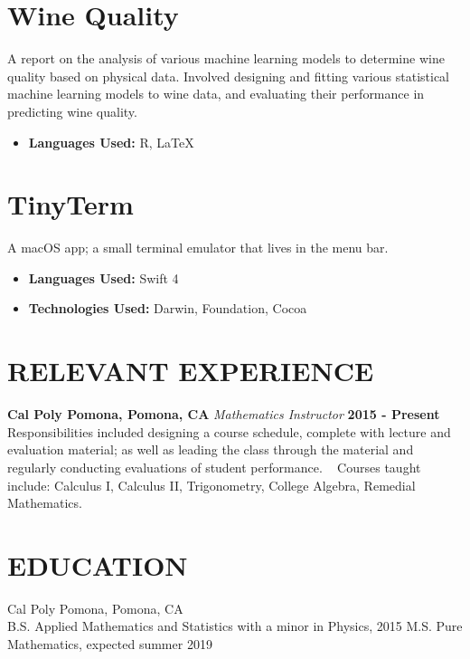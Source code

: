 \documentclass[margin]{../res}
\begin{document}
\begin{resume}
\normalsize{\section{Wine Quality}}
A report on the analysis of various machine learning models to determine wine
quality based on physical data.
Involved designing and fitting various statistical machine learning models to wine data, and
evaluating their performance in predicting wine quality.
\begin{itemize}
\item {\bf Languages Used: }\newline R, LaTeX
\end{itemize}

\normalsize{\section{TinyTerm}} A macOS app; a small terminal emulator that
lives in the menu bar.
\begin{multicols}{2}
\begin{itemize}
\item {\bf Languages Used: } \newline Swift 4
  \columnbreak
\item {\bf Technologies Used: } \newline Darwin, Foundation, Cocoa
\end{itemize}
\end{multicols}

\section{RELEVANT EXPERIENCE}
{\bf Cal Poly Pomona, Pomona, CA}\newline
{\it Mathematics Instructor}\newline
{\bf 2015 - Present}\newline
Responsibilities included designing a course schedule, complete with lecture and
evaluation material; as well as leading the class through the material and
regularly conducting evaluations of student performance.\newline
\ \newline
Courses taught include: Calculus I, Calculus II, Trigonometry, College Algebra,
Remedial Mathematics.

\section{EDUCATION}
Cal Poly Pomona, Pomona, CA \\
B.S. Applied Mathematics and Statistics with a minor in Physics, 2015 \newline
M.S. Pure Mathematics, expected summer 2019


\end{resume}
\end{document}
